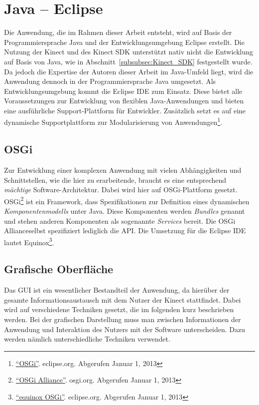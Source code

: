 \section{Java -- Eclipse}
Die Anwendung, die im Rahmen dieser Arbeit entsteht, wird auf Basis der Programmiersprache Java und der Entwicklungsumgebung Eclipse erstellt.
Die Nutzung der Kinect und des Kinect SDK unterst\"utzt nativ nicht die Entwicklung auf Basis von Java, wie in Abschnitt~\ref{subsubsec:Kinect_SDK}
festgestellt wurde. Da jedoch die Expertise der Autoren dieser Arbeit im Java-Umfeld liegt, wird die Anwendung dennoch in der Programmiersprache Java umgesetzt.
\newline
Als Entwicklungsumgebung kommt die \gls{Eclipse} \acrshort{IDE} zum Einsatz. Diese bietet alle Voraussetzungen zur Entwicklung von flexiblen Java-Anwendungen und bieten eine
ausf\"uhrliche Support-Plattform f\"ur Entwickler. Zus\"atzlich setzt es auf eine dynamische Supportplattform zur Modularisierung von Anwendungen\footnote{\href{http://eclipse.org/osgi/}{\enquote{OSGi}}. eclipse.org. Abgerufen Januar 1, 2013}.

\subsection{OSGi}
Zur Entwicklung einer komplexen Anwendung mit vielen Abh\"angigkeiten und Schnittstellen, wie die hier zu erarbeitende, braucht es eine entsprechend \textit{m\"achtige} Software-Architektur. Dabei wird hier auf OSGi-Plattform gesetzt.
OSGi\footnote{\href{http://www.osgi.org/Technology/HomePage}{\enquote{OSGi Alliance}}. osgi.org. Abgerufen Januar 1, 2013} ist ein \gls{Framework}, dass Spezifikationen zur Definition eines dynamischen \textit{Komponentenmodells} unter Java.
Diese Komponenten werden \textit{Bundles} genannt und stehen anderen Komponenten als sogenannte \textit{Services} bereit.
Die OSGi Alliance\footnotemark[1] selbst spezifiziert lediglich die \gls{API}. Die Umsetzung f\"ur die Eclipse \acrshort{IDE} lautet \gls{Equinox}\footnote{\href{http://eclipse.org/equinox/}{\enquote{equinox OSGi}}. eclipse.org. Abgerufen Januar 1, 2013}.

\subsection{Grafische Oberfl\"ache}
Das \gls{GUI} ist ein wesentlicher Bestandteil der Anwendung, da hier\"uber der gesamte Informationsaustausch mit dem Nutzer der Kinect stattfindet.
Dabei wird auf verschiedene Techniken gesetzt, die im folgenden kurz beschrieben werden.
\newline
Bei der grafischen Darstellung muss man zwischen Informationen der Anwendung und Interaktion des Nutzers mit der Software unterscheiden. Dazu werden n\"amlich unterschiedliche Techniken verwendet.


